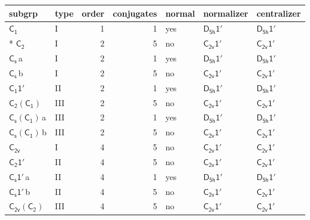 \documentclass[10pt,a4paper]{article}
\numberwithin{equation}{section}
\newcommand{\grp}[1]{\mathsf{#1}}
\newcommand{\clsletter}[1]{\,{\scriptsize\color{black!55}#1}}
\begin{document}
{\small\begin{longtable}{@{}llrrlll@{}}\toprule
subgrp & type & order & conjugates & normal & normalizer & centralizer\\\midrule\endhead
\bottomrule\endfoot\endlastfoot
\href{../../../rotation/data/pdf/C1.pdf}{$\grp{C_{1}}$} & I & 1 & 1 & yes & \href{D5h-1p.pdf}{$\grp{D_{5h}1'}$} & \href{D5h-1p.pdf}{$\grp{D_{5h}1'}$}\\*
\href{../../../rotation/data/pdf/C2.pdf}{$\grp{C_{2}}$} & I & 2 & 5 & no & \href{C2v-1p.pdf}{$\grp{C_{2v}1'}$} & \href{C2v-1p.pdf}{$\grp{C_{2v}1'}$}\\
\href{../../../rotation/data/pdf/C1v.pdf}{$\grp{C_{s}}$}\clsletter{a} & I & 2 & 1 & yes & \href{D5h-1p.pdf}{$\grp{D_{5h}1'}$} & \href{D5h-1p.pdf}{$\grp{D_{5h}1'}$}\\
\href{../../../rotation/data/pdf/C1v.pdf}{$\grp{C_{s}}$}\clsletter{b} & I & 2 & 5 & no & \href{C2v-1p.pdf}{$\grp{C_{2v}1'}$} & \href{C2v-1p.pdf}{$\grp{C_{2v}1'}$}\\
\href{C1-1p.pdf}{$\grp{C_{1}1'}$} & II & 2 & 1 & yes & \href{D5h-1p.pdf}{$\grp{D_{5h}1'}$} & \href{D5h-1p.pdf}{$\grp{D_{5h}1'}$}\\
\href{C2-C1.pdf}{$\grp{C_{2}}(\grp{C_{1}})$} & III & 2 & 5 & no & \href{C2v-1p.pdf}{$\grp{C_{2v}1'}$} & \href{C2v-1p.pdf}{$\grp{C_{2v}1'}$}\\
\href{C1v-C1.pdf}{$\grp{C_{s}}(\grp{C_{1}})$}\clsletter{a} & III & 2 & 1 & yes & \href{D5h-1p.pdf}{$\grp{D_{5h}1'}$} & \href{D5h-1p.pdf}{$\grp{D_{5h}1'}$}\\
\href{C1v-C1.pdf}{$\grp{C_{s}}(\grp{C_{1}})$}\clsletter{b} & III & 2 & 5 & no & \href{C2v-1p.pdf}{$\grp{C_{2v}1'}$} & \href{C2v-1p.pdf}{$\grp{C_{2v}1'}$}\\
\href{../../../rotation/data/pdf/C2v.pdf}{$\grp{C_{2v}}$} & I & 4 & 5 & no & \href{C2v-1p.pdf}{$\grp{C_{2v}1'}$} & \href{C2v-1p.pdf}{$\grp{C_{2v}1'}$}\\
\href{C2-1p.pdf}{$\grp{C_{2}1'}$} & II & 4 & 5 & no & \href{C2v-1p.pdf}{$\grp{C_{2v}1'}$} & \href{C2v-1p.pdf}{$\grp{C_{2v}1'}$}\\
\href{C1v-1p.pdf}{$\grp{C_{s}1'}$}\clsletter{a} & II & 4 & 1 & yes & \href{D5h-1p.pdf}{$\grp{D_{5h}1'}$} & \href{D5h-1p.pdf}{$\grp{D_{5h}1'}$}\\
\href{C1v-1p.pdf}{$\grp{C_{s}1'}$}\clsletter{b} & II & 4 & 5 & no & \href{C2v-1p.pdf}{$\grp{C_{2v}1'}$} & \href{C2v-1p.pdf}{$\grp{C_{2v}1'}$}\\
\href{C2v-C2.pdf}{$\grp{C_{2v}}(\grp{C_{2}})$} & III & 4 & 5 & no & \href{C2v-1p.pdf}{$\grp{C_{2v}1'}$} & \href{C2v-1p.pdf}{$\grp{C_{2v}1'}$}\\

\end{longtable}}
\end{document}
